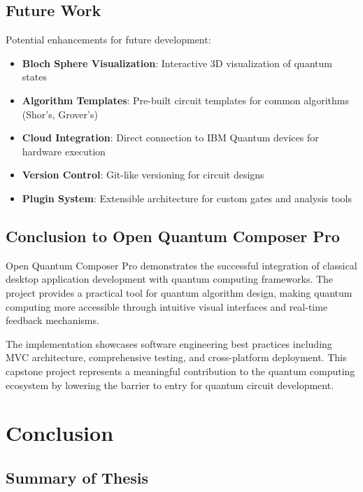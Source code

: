 \documentclass[12pt, a4paper, oneside]{report}
\theoremstyle{plain}
\theoremstyle{definition}
\theoremstyle{remark}
\begin{document}
\section{Future Work}

Potential enhancements for future development:

\begin{itemize}
	\item \textbf{Bloch Sphere Visualization}: Interactive 3D visualization of quantum states
	\item \textbf{Algorithm Templates}: Pre-built circuit templates for common algorithms (Shor's, Grover's)
	\item \textbf{Cloud Integration}: Direct connection to IBM Quantum devices for hardware execution
	\item \textbf{Version Control}: Git-like versioning for circuit designs
	\item \textbf{Plugin System}: Extensible architecture for custom gates and analysis tools
\end{itemize}

\section{Conclusion to Open Quantum Composer Pro}

Open Quantum Composer Pro demonstrates the successful integration of classical desktop application development with quantum computing frameworks. The project provides a practical tool for quantum algorithm design, making quantum computing more accessible through intuitive visual interfaces and real-time feedback mechanisms.

The implementation showcases software engineering best practices including MVC architecture, comprehensive testing, and cross-platform deployment. This capstone project represents a meaningful contribution to the quantum computing ecosystem by lowering the barrier to entry for quantum circuit development.



\chapter{Conclusion}
\label{ch:thesis-conclusion}

\section{Summary of Thesis}
\end{document}
